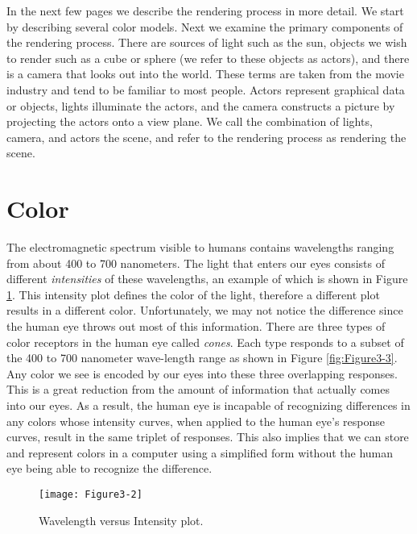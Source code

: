 In the next few pages we describe the rendering process in more detail. We start by describing several color models. Next we examine the primary components of the rendering process. There are sources of light such as the sun, objects we wish to render such as a cube or sphere (we refer to these objects as actors), and there is a camera that looks out into the world. These terms are taken from the movie industry and tend to be familiar to most people. Actors represent graphical data or objects, lights illuminate the actors, and the camera constructs a picture by projecting the actors onto a view plane. We call the combination of lights, camera, and actors the scene, and refer to the rendering process as rendering the scene.

\section{Color}
\label{sec:color}

The electromagnetic spectrum visible to humans contains wavelengths ranging from about 400 to 700 nanometers. The light that enters our eyes consists of different \emph{intensities} of these wavelengths, an example of which is shown in Figure \ref{fig:Figure3-2}. This intensity plot defines the color of the light, therefore a different plot results in a different color. Unfortunately, we may not notice the difference since the human eye throws out most of this information. There are three types of color receptors in the human eye called \emph{cones}. Each type responds to a subset of the 400 to 700 nanometer wave-length range as shown in Figure \ref{fig:Figure3-3}. Any color we see is encoded by our eyes into these three overlapping responses. This is a great reduction from the amount of information that actually comes into our eyes. As a result, the human eye is incapable of recognizing differences in any colors whose intensity curves, when applied to the human eye's response curves, result in the same triplet of responses. This also implies that we can store and represent colors in a computer using a simplified form without the human eye being able to recognize the difference.

\begin{figure}[!htb]
  \centering
  \texttt{[image: Figure3-2]}\\
  \caption{Wavelength versus Intensity plot.}\label{fig:Figure3-2}
\end{figure}

